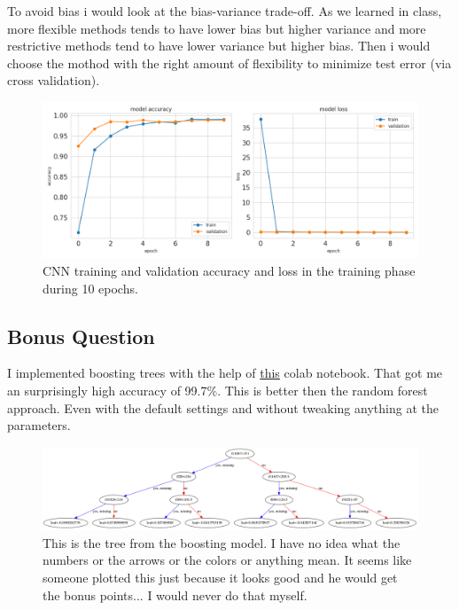 \documentclass[]{article}
\begin{document}
	To avoid bias i would look at the bias-variance trade-off. As we learned in class, more flexible methods tends to have lower bias but higher variance and more restrictive methods tend to have lower variance but higher bias. Then i would choose the mothod with the right amount of flexibility to minimize test error (via cross validation). 
	\begin{figure}
		\centering
		\includegraphics[width=1\textwidth]{images/history.png}
		\caption{CNN training and validation accuracy and loss in the training phase during 10 epochs.}
		\label{fig:history}
	\end{figure}
	\subsection{Bonus Question}
	I implemented boosting trees with the help of \href{https://colab.research.google.com/drive/1tRzL1GGOJDgz7CHSY1HECd4IwNAjuip5?usp=sharing#scrollTo=FoJbT_rFyGMs}{this} colab notebook. That got me an surprisingly high accuracy of 99.7\%. This is better then the random forest approach. Even with the default settings and without tweaking anything at the parameters.
	\begin{figure}[h]
		\centering
		\includegraphics[width=1\textwidth]{images/boosting.png}
		\caption{This is the tree from the boosting model. I have no idea what the numbers or the arrows or the colors or anything mean. It seems like someone plotted this just because it looks good and he would get the bonus points... I would never do that myself.}
		\label{fig:boosting}
	\end{figure}
	\appendix
	\renewcommand\thefigure{\thesection\arabic{figure}} 
	\clearpage   
\end{document}
